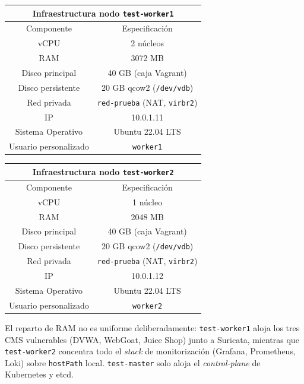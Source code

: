 \begin{center}
  \begin{tabular}{|c|c|}
    \hline
    \multicolumn{2}{|c|}{Infraestructura nodo \texttt{test-worker1}} \\
    \hline
    Componente & Especificación \\
    \hline
    vCPU & 2 núcleos \\
    RAM & 3072 MB \\
    Disco principal & 40 GB (caja Vagrant) \\
    Disco persistente & 20 GB qcow2 (\texttt{/dev/vdb}) \\
    Red privada & \texttt{red-prueba} (NAT, \texttt{virbr2}) \\
    IP & 10.0.1.11 \\
    Sistema Operativo & Ubuntu 22.04 LTS \\
    Usuario personalizado & \texttt{worker1} \\
    \hline
  \end{tabular}
\end{center}

\begin{center}
  \begin{tabular}{|c|c|}
    \hline
    \multicolumn{2}{|c|}{Infraestructura nodo \texttt{test-worker2}} \\
    \hline
    Componente & Especificación \\
    \hline
    vCPU & 1 núcleo \\
    RAM & 2048 MB \\
    Disco principal & 40 GB (caja Vagrant) \\
    Disco persistente & 20 GB qcow2 (\texttt{/dev/vdb}) \\
    Red privada & \texttt{red-prueba} (NAT, \texttt{virbr2}) \\
    IP & 10.0.1.12 \\
    Sistema Operativo & Ubuntu 22.04 LTS \\
    Usuario personalizado & \texttt{worker2} \\
    \hline
  \end{tabular}
\end{center}

El reparto de RAM no es uniforme deliberadamente: \texttt{test-worker1} aloja los tres CMS vulnerables (DVWA, WebGoat, Juice Shop) junto a Suricata, mientras que \texttt{test-worker2} concentra todo el \emph{stack} de monitorización (Grafana, Prometheus, Loki) sobre \texttt{hostPath} local. \texttt{test-master} solo aloja el \emph{control-plane} de Kubernetes y etcd.

